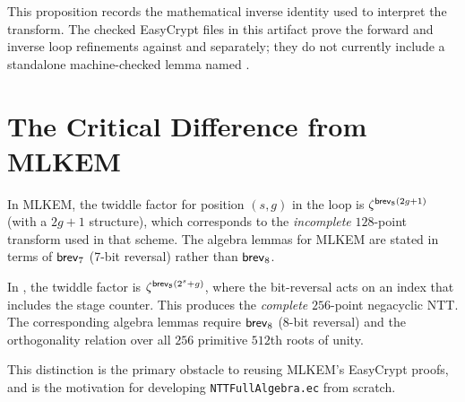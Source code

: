 This proposition records the mathematical inverse identity used to interpret
the transform.  The checked EasyCrypt files in this artifact prove the
forward and inverse loop refinements against  and
 separately; they do not currently include a standalone
machine-checked lemma named .

\section{The Critical Difference from MLKEM}

\begin{remark}
  In MLKEM, the twiddle factor for position $(s, g)$ in the loop is
  $\zeta^{\mathsf{brev}_8(2g+1)}$ (with a $2g+1$ structure), which corresponds to
  the \emph{incomplete} $128$-point transform used in that scheme.  The
  algebra lemmas for MLKEM are stated in terms of $\mathsf{brev}_7$ (7-bit reversal)
  rather than $\mathsf{brev}_8$.

  In \haetae{}, the twiddle factor is $\zeta^{\mathsf{brev}_8(2^s + g)}$, where the
  bit-reversal acts on an index that includes the stage counter.  This produces
  the \emph{complete} $256$-point negacyclic NTT.  The corresponding algebra
  lemmas require $\mathsf{brev}_8$ (8-bit reversal) and the orthogonality relation over
  all $256$ primitive $512$th roots of unity.

  This distinction is the primary obstacle to reusing MLKEM's EasyCrypt
  proofs, and is the motivation for developing \texttt{NTTFullAlgebra.ec}
  from scratch.
\label{rem:haetae_mlkem}
\end{remark}
